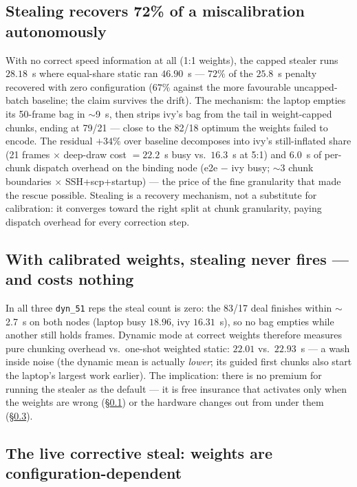 \documentclass[
	english,
	letterpaper, oneside
]{article}
\begin{document}
\subsection{Stealing recovers 72\% of a miscalibration autonomously}
\label{sec:recovery}

With no correct speed information at all (1:1 weights), the capped stealer
runs $28.18$~s where equal-share static ran $46.90$~s --- $72\%$ of the
$25.8$~s penalty recovered with zero configuration ($67\%$ against the
more favourable uncapped-batch baseline; the claim survives the drift).
The mechanism: the laptop empties its 50-frame bag in $\sim$9~s, then
strips ivy's bag from the tail in weight-capped chunks, ending at 79/21 ---
close to the 82/18 optimum the weights failed to encode. The residual
$+34\%$ over baseline decomposes into ivy's still-inflated share (21 frames
$\times$ deep-draw cost $= 22.2$~s busy vs.\ $16.3$~s at 5:1) and
$6.0$~s of per-chunk dispatch overhead on the binding node (e2e $-$ ivy
busy; $\sim$3 chunk boundaries $\times$ SSH+scp+startup) --- the price of
the fine granularity that made the rescue possible. Stealing is a recovery
mechanism, not a substitute for calibration: it converges toward the right
split at chunk granularity, paying dispatch overhead for every correction
step.

\subsection{With calibrated weights, stealing never fires --- and costs nothing}
\label{sec:insurance}

In all three \texttt{dyn\_51} reps the steal count is zero: the 83/17 deal
finishes within $\sim$2.7~s on both nodes (laptop busy $18.96$, ivy
$16.31$~s), so no bag empties while another still holds frames. Dynamic
mode at correct weights therefore measures pure chunking overhead vs.\
one-shot weighted static: $22.01$ vs.\ $22.93$~s --- a wash inside noise
(the dynamic mean is actually \emph{lower}; its guided first chunks also
start the laptop's largest work earlier). The implication: there is no
premium for running the stealer as the default --- it is free insurance
that activates only when the weights are wrong
(\S\ref{sec:recovery}) or the hardware changes out from under them
(\S\ref{sec:corrective}).

\subsection{The live corrective steal: weights are configuration-dependent}
\label{sec:corrective}
\end{document}
